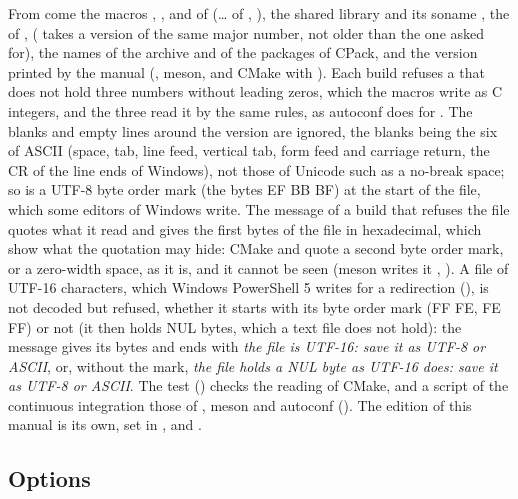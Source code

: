 \noindent
From  come the macros ,
,  and
 of 
(\ldots{} of ,
), the shared library
 and its soname
, the  of ,
 (
takes a version of the same major number, not older than the one asked for),
the names of the archive and of the packages of CPack, and the version printed
by the manual (, meson, and CMake with ). Each build refuses a
 that does not hold three numbers without leading zeros,
which the macros write as C integers, and the three read it by the same
rules, as autoconf does for . The blanks and empty
lines around the version are ignored, the blanks being the six of ASCII
(space, tab, line feed, vertical tab, form feed and carriage return, the CR of
the line ends of Windows), not those of Unicode such as a no-break space; so
is a UTF-8 byte order mark (the bytes EF BB BF) at the start of the file,
which some editors of Windows write. The message of a build that refuses the
file quotes what it read and gives the first bytes of the file in
hexadecimal, which show what the quotation may hide: CMake and
 quote a second byte order mark, or a zero-width space, as it
is, and it cannot be seen (meson writes it ,
). A file of UTF-16 characters, which Windows
PowerShell 5 writes for a redirection (), is not
decoded but refused, whether it starts with its byte order mark (FF FE, FE FF)
or not (it then holds NUL bytes, which a text file does not hold): the message
gives its bytes and ends with \emph{the file is UTF-16: save it as UTF-8 or
ASCII}, or, without the mark, \emph{the file holds a NUL byte as UTF-16 does:
save it as UTF-8 or ASCII}. The test 
() checks the reading of CMake, and a script of
the continuous integration those of , meson and autoconf
(). The edition of this manual is its own, set in
,  and .

\subsection{Options}\label{sec:cmake-options}

